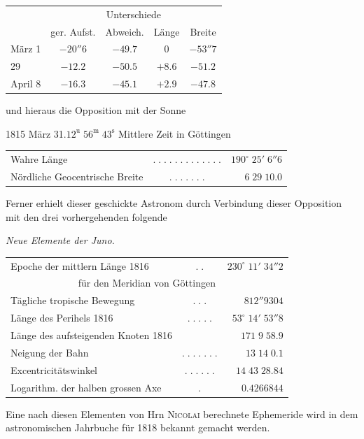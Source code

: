 \begin{center}
\fontsize{10}{12}\selectfont\setlength{\tabcolsep}{6pt}\renewcommand{\arraystretch}{1.15}\begin{tabular}{l | c | c | c | c}
& \multicolumn{4}{c}{Unterschiede} \\
& ger. Aufst. & Abweich. & Länge & Breite \\
\hline
März 1 & $-20''6$ & $-49.7$ & $0$ & $-53''7$ \\
29 & $-12.2$ & $-50.5$ & $+8.6$ & $-51.2$ \\
April 8 & $-16.3$ & $-45.1$ & $+2.9$ & $-47.8$ \\
\end{tabular}
\end{center}

\noindent und hieraus die Opposition mit der Sonne

\begin{center}1815 März 31.\quad $12^{\mathrm u}\;56^{\mathrm m}\;43^{\mathrm s}$ Mittlere Zeit in Göttingen\end{center}
\begin{center}\fontsize{9}{11}\selectfont\setlength{\tabcolsep}{2pt}\renewcommand{\arraystretch}{1.15}\begin{tabular}{lcr}
Wahre Länge & $.\;.\;.\;.\;.\;.\;.\;.\;.\;.\;.\;.\;.$ & $190^\circ\;25'\;6''6$\\
Nördliche Geocentrische Breite & $.\;.\;.\;.\;.\;.\;.$ & $6\;29\;10.0$\\
\end{tabular}\end{center}

\par\indent Ferner erhielt dieser geschickte Astronom durch Verbindung dieser Opposition mit den drei vorhergehenden folgende

\begin{center}
\emph{Neue Elemente der Juno.}
\end{center}

\begin{center}\fontsize{9}{11}\selectfont\setlength{\tabcolsep}{2pt}\renewcommand{\arraystretch}{1.15}\begin{tabular}{lcr}
Epoche der mittlern Länge 1816 & $.\;.$ & $230^\circ\;11'\;34''2$\\
\multicolumn{3}{c}{für den Meridian von Göttingen}\\
Tägliche tropische Bewegung & $.\;.\;.$ & $812''9304$\\
Länge des Perihels 1816 & $.\;.\;.\;.\;.$ & $53^\circ\;14'\;53''8$\\
Länge des aufsteigenden Knoten 1816 &  & $171\;9\;58.9$\\
Neigung der Bahn & $.\;.\;.\;.\;.\;.\;.$ & $13\;14\;0.1$\\
Excentricitätswinkel & $.\;.\;.\;.\;.\;.$ & $14\;43\;28.84$\\
Logarithm. der halben grossen Axe & $.$ & $0.4266844$\\
\end{tabular}\end{center}

\par\indent Eine nach diesen Elementen von Hrn \textsc{Nicolai} berechnete Ephemeride wird in dem astronomischen Jahrbuche für 1818 bekannt gemacht werden.
